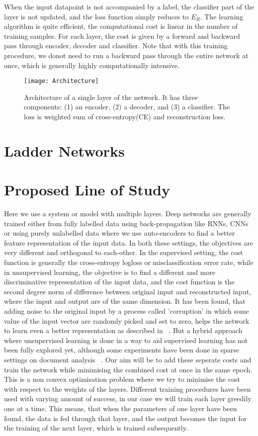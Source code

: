 \documentclass[a4paper,11pt]{kth-mag}
\begin{document}
 When the input datapoint is not accompanied by a label, the classifier part of the layer is not updated, and the loss function simply reduces to $E_{R}$. 
 The learning algorithm is quite efficient, the computational cost is linear in the number of training samples. For each layer, the cost is given by a forward and backward pass through encoder, decoder and classifier. Note that with this training procedure, we donot need to run a backward pass through the entire network at once, which is generally highly computationally intensive. 
\begin{figure}[h]
\caption{Architecture of a single layer of the network. It has three components: (1) an encoder, (2) a decoder, and (3) a classifier. The loss is weighted sum of cross-entropy(CE) and reconstruction loss.}
\centering
\texttt{[image: Architecture]}
\end{figure} 
\section{Ladder Networks}
\section{Proposed Line of Study}
Here we use a system or model with multiple layers. Deep networks are generally trained either from fully labelled data using back-propagation like RNNs, CNNs or using purely unlabelled data where we use auto-encoders to find a better feature representation of the input data. In both these settings, the objectives are very different and orthogonal to each-other. In the supervised setting, the cost function is generally the cross-entropy logloss or misclassification error rate, while in unsupervised learning, the objective is to find a different and more discriminative representation of the input data, and the cost function is the second degree norm of difference between original input and reconstructed input, where the input and output are of the same dimension. It has been found, that adding noise to the original input by a process called 'corruption' in which some value of the input vector are randomly picked and set to zero, helps the network to learn even a better representation as described in ~\cite{Bengio-nips-2006}. But a hybrid approach where unsupervised learning is done in a way to aid supervised learning has not been fully explored yet, although some experiments have been done in sparse settings on document analysis ~\cite{ranzato-2008}. Our aim will be to add these seperate costs and train the network while minimising the combined cost at once in the same epoch. This is a non convex optimisation problem where we try to minimise the cost with respect to the weights of the layers. Different training procedures have been used with varying amount of success, in our case we will train each layer greedily one at a time. This means, that when the parameters of one layer have been found, the data is fed through that layer, and the output becomes the input for the training of the next layer, which is trained subsequently. 
\end{document}
